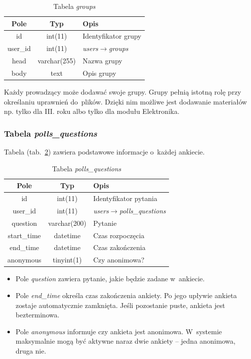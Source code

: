 \documentclass[a4paper,12pt,oneside]{report}
\begin{document}
\begin{table}[h]
  \centering
  \begin{tabular}{|c|c|l|}\hline
  Pole & Typ & Opis \\\hline
  id       & int(11)      & Identyfikator grupy\\
  user\_id & int(11)      & \emph{users}$\to$\emph{groups}\\
  head     & varchar(255) & Nazwa grupy \\
  body     & text         & Opis grupy \\\hline
  \end{tabular}
  \caption{Tabela \emph{groups}\label{tab:groups}}
\end{table}
 Każdy prowadzący może dodawać swoje grupy. Grupy pełnią istotną rolę przy określaniu uprawnień do~plików. Dzięki nim możliwe jest dodawanie materiałów np. tylko dla III. roku albo tylko dla modułu Elektronika.

\newpage
\subsubsection{Tabela \emph{polls\_questions}}
\label{subsub:polls_questions}
Tabela (tab.~\ref{tab:polls_questions}) zawiera podstawowe informacje o~każdej ankiecie.

\begin{table}[h]
  \centering
  \begin{tabular}{|c|c|l|}\hline
  Pole & Typ & Opis \\\hline
  id          & int(11)      & Identyfikator pytania\\
  user\_id    & int(11)      & \emph{users}$\to$\emph{polls\_questions}\\
  question    & varchar(200) & Pytanie \\
  start\_time & datetime     & Czas rozpoczęcia \\
  end\_time   & datetime     & Czas zakończenia \\
  anonymous   & tinyint(1)   & Czy anonimowa? \\\hline

  \end{tabular}
  \caption{Tabela \emph{polls\_questions}\label{tab:polls_questions}}
\end{table}
\begin{itemize}
  \item Pole \emph{question} zawiera pytanie, jakie będzie zadane w~ankiecie.
  \item Pole \emph{end\_time} określa czas zakończenia ankiety. Po jego upływie ankieta zostaje automatycznie zamknięta. Jeśli pozostanie puste, ankieta jest bezterminowa.
  \item Pole \emph{anonymous} informuje czy ankieta jest anonimowa. W~systemie maksymalnie mogą być aktywne naraz dwie ankiety -- jedna anonimowa, druga nie.
\end{itemize}
\end{document}
